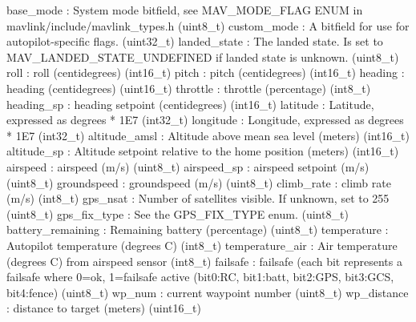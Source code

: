 \begin{DoxyVerb}
\begin{DoxyVerb}
\begin{DoxyVerb}
base_mode                 : System mode bitfield, see MAV_MODE_FLAG ENUM in mavlink/include/mavlink_types.h (uint8_t)
custom_mode               : A bitfield for use for autopilot-specific flags. (uint32_t)
landed_state              : The landed state. Is set to MAV_LANDED_STATE_UNDEFINED if landed state is unknown. (uint8_t)
roll                      : roll (centidegrees) (int16_t)
pitch                     : pitch (centidegrees) (int16_t)
heading                   : heading (centidegrees) (uint16_t)
throttle                  : throttle (percentage) (int8_t)
heading_sp                : heading setpoint (centidegrees) (int16_t)
latitude                  : Latitude, expressed as degrees * 1E7 (int32_t)
longitude                 : Longitude, expressed as degrees * 1E7 (int32_t)
altitude_amsl             : Altitude above mean sea level (meters) (int16_t)
altitude_sp               : Altitude setpoint relative to the home position (meters) (int16_t)
airspeed                  : airspeed (m/s) (uint8_t)
airspeed_sp               : airspeed setpoint (m/s) (uint8_t)
groundspeed               : groundspeed (m/s) (uint8_t)
climb_rate                : climb rate (m/s) (int8_t)
gps_nsat                  : Number of satellites visible. If unknown, set to 255 (uint8_t)
gps_fix_type              : See the GPS_FIX_TYPE enum. (uint8_t)
battery_remaining         : Remaining battery (percentage) (uint8_t)
temperature               : Autopilot temperature (degrees C) (int8_t)
temperature_air           : Air temperature (degrees C) from airspeed sensor (int8_t)
failsafe                  : failsafe (each bit represents a failsafe where 0=ok, 1=failsafe active (bit0:RC, bit1:batt, bit2:GPS, bit3:GCS, bit4:fence) (uint8_t)
wp_num                    : current waypoint number (uint8_t)
wp_distance               : distance to target (meters) (uint16_t)\end{DoxyVerb}
 \mbox{\label{classpymavlink_1_1dialects_1_1v10_1_1MAVLink_aeda010e9d611f3f52164dd883a7416e6}} 

\end{DoxyVerb}
\end{DoxyVerb}
